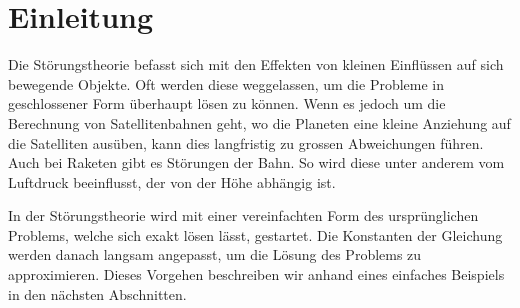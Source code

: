 \section{Einleitung\label{perturbation:section:einleitung}}
Die Störungstheorie befasst sich mit den Effekten von kleinen Einflüssen auf sich bewegende Objekte. 
Oft werden diese weggelassen, um die Probleme in geschlossener Form überhaupt lösen zu können. 
Wenn es jedoch um die Berechnung von Satellitenbahnen geht, wo die Planeten eine kleine Anziehung auf die Satelliten ausüben, kann dies langfristig zu grossen Abweichungen führen. 
Auch bei Raketen gibt es Störungen der Bahn. So wird diese unter anderem vom Luftdruck beeinflusst, der von der Höhe abhängig ist. 

In der Störungstheorie wird mit einer vereinfachten Form des ursprünglichen Problems, welche sich exakt lösen lässt, gestartet. 
Die Konstanten der Gleichung werden danach langsam angepasst, um die Lösung des Problems zu approximieren. 
Dieses Vorgehen beschreiben wir anhand eines einfaches Beispiels in den nächsten Abschnitten.


